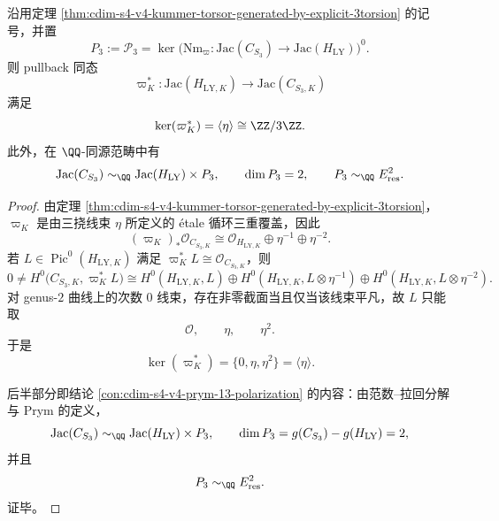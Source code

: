 \begin{theorem}\label{thm:cdim-s4-v4-jacobian-pullback-kernel-and-prym-splitting}
沿用定理 \ref{thm:cdim-s4-v4-kummer-torsor-generated-by-explicit-3torsion} 的记号，并置
\[
P_3:=\mathcal P_3=\ker\!\bigl(\mathrm{Nm}_{\varpi}:\mathrm{Jac}(C_{S_3})\to \mathrm{Jac}(H_{\mathrm{LY}})\bigr)^0.
\]
则 pullback 同态
\[
\varpi_K^*:\mathrm{Jac}(H_{\mathrm{LY},K})\longrightarrow \mathrm{Jac}(C_{S_3,K})
\]
满足
\[
\ker(\varpi_K^*)=\langle \eta\rangle\cong \ZZ/3\ZZ.
\]
此外，在 \(\QQ\)-同源范畴中有
\[
\mathrm{Jac}(C_{S_3})\sim_{\QQ}\mathrm{Jac}(H_{\mathrm{LY}})\times P_3,
\qquad
\dim P_3=2,
\qquad
P_3\sim_{\QQ}E_{\mathrm{res}}^2.
\]
\end{theorem}
\begin{proof}
由定理 \ref{thm:cdim-s4-v4-kummer-torsor-generated-by-explicit-3torsion}，\(\varpi_K\) 是由三挠线束 \(\eta\) 所定义的 étale 循环三重覆盖，因此
\[
(\varpi_K)_*\mathcal O_{C_{S_3,K}}
\cong
\mathcal O_{H_{\mathrm{LY},K}}
\oplus \eta^{-1}\oplus \eta^{-2}.
\]
若 \(L\in \operatorname{Pic}^0(H_{\mathrm{LY},K})\) 满足 \(\varpi_K^*L\cong \mathcal O_{C_{S_3,K}}\)，则
\[
0\neq H^0\!\bigl(C_{S_3,K},\varpi_K^*L\bigr)
\cong
H^0(H_{\mathrm{LY},K},L)\oplus
H^0(H_{\mathrm{LY},K},L\otimes\eta^{-1})\oplus
H^0(H_{\mathrm{LY},K},L\otimes\eta^{-2}).
\]
对 genus-\(2\) 曲线上的次数 \(0\) 线束，存在非零截面当且仅当该线束平凡，故 \(L\) 只能取
\[
\mathcal O,\qquad \eta,\qquad \eta^2.
\]
于是
\[
\ker(\varpi_K^*)=\{0,\eta,\eta^2\}=\langle\eta\rangle.
\]

后半部分即结论 \ref{con:cdim-s4-v4-prym-13-polarization} 的内容：由范数--拉回分解与 Prym 的定义，
\[
\mathrm{Jac}(C_{S_3})\sim_{\QQ}\mathrm{Jac}(H_{\mathrm{LY}})\times P_3,
\qquad
\dim P_3=g(C_{S_3})-g(H_{\mathrm{LY}})=2,
\]
并且
\[
P_3\sim_{\QQ}E_{\mathrm{res}}^2.
\]
证毕。
\end{proof}

